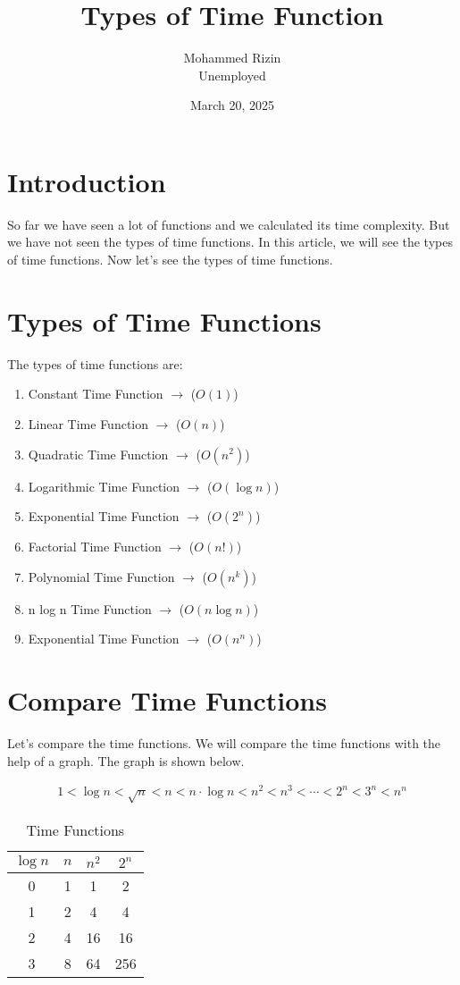 \documentclass[]{article}
\title{Types of Time Function}
\author{Mohammed Rizin \\ Unemployed}
\date{March 20, 2025}
\begin{document}
\maketitle

\section{Introduction}
So far we have seen a lot of functions and we calculated its time complexity. But we have not seen the types of time functions. In this article, we will see the types of time functions. 
Now let's see the types of time functions.

\section{Types of Time Functions}
The types of time functions are:
\begin{enumerate}
    \item Constant Time Function $\rightarrow$ ($O(1)$)
    \item Linear Time Function $\rightarrow$ ($O(n)$)
    \item Quadratic Time Function $\rightarrow$ ($O(n^2)$)
    \item Logarithmic Time Function $\rightarrow$ ($O(\log n)$)
    \item Exponential Time Function $\rightarrow$ ($O(2^n)$)
    \item Factorial Time Function $\rightarrow$ ($O(n!)$)
    \item Polynomial Time Function $\rightarrow$ ($O(n^k)$)
    \item n log n Time Function $\rightarrow$ ($O(n \log n)$)
    \item Exponential Time Function $\rightarrow$ ($O(n^n)$)
\end{enumerate}

\section{Compare Time Functions}
Let's compare the time functions. We will compare the time functions with the help of a graph. The graph is shown below.

\[
\begin{aligned}
    1 < \log{n} < \sqrt{n} < n < n\cdot \log{n} < n^2 < n^3 < \cdots < 2^n <  3^n < n^n
\end{aligned}
\]

\begin{table}[H]
    \centering
    \begin{tabular}{|c|c|c|c|}
        \hline
        $\log{n}$ & $n$ & $n^2$ & $2^n$ \\
        \hline
        0 & 1 & 1 & 2 \\
        1 & 2 & 4 & 4 \\
        2 & 4 & 16 & 16 \\
        3 & 8 & 64 & 256 \\
        \hline
    \end{tabular}
    \caption{Time Functions}
\end{table}
\end{document}
